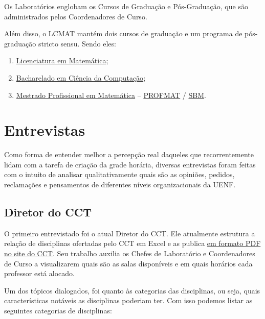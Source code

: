 Os Laboratórios englobam os Cursos de Graduação e Pós-Graduação, que são administrados pelos Coordenadores de Curso.

Além disso, o LCMAT mantém dois cursos de graduação e um programa de pós-graduação stricto sensu. Sendo eles:

\begin{enumerate}
  \item \href{https://uenf.br/posgraduacao/licenciatura-matematica/}{Licenciatura em Matemática};
  \item \href{https://cc.uenf.br/}{Bacharelado em Ciência da Computação};
  \item \href{https://uenf.br/posgraduacao/matematica/apresentacao/}{Mestrado Profissional em Matemática} – \href{https://uenf.br/posgraduacao/programas/pos-graduacao-stricto-sensu/}{PROFMAT} / \href{https://www.profmat-sbm.org.br/}{SBM}.
\end{enumerate}

\section{Entrevistas} %


Como forma de entender melhor a percepção real daqueles que recorrentemente lidam com a tarefa de criação da grade horária, diversas entrevistas foram feitas com o intuito de analisar qualitativamente quais são as opiniões, pedidos, reclamações e pensamentos de diferentes níveis organizacionais da UENF.

\subsection{Diretor do CCT} %


O primeiro entrevistado foi o atual Diretor do CCT. Ele atualmente estrutura a relação de disciplinas ofertadas pelo CCT em Excel e as publica \href{https://uenf.br/cct/secretaria-academica/distribuicao-das-salas-de-aula-do-cct/}{em formato PDF no site do CCT}. Seu trabalho auxilia os Chefes de Laboratório e Coordenadores de Curso a visualizarem quais são as salas disponíveis e em quais horários cada professor está alocado.

Um dos tópicos dialogados, foi quanto às categorias das disciplinas, ou seja, quais características notáveis as disciplinas poderiam ter. Com isso podemos listar as seguintes categorias de disciplinas:

